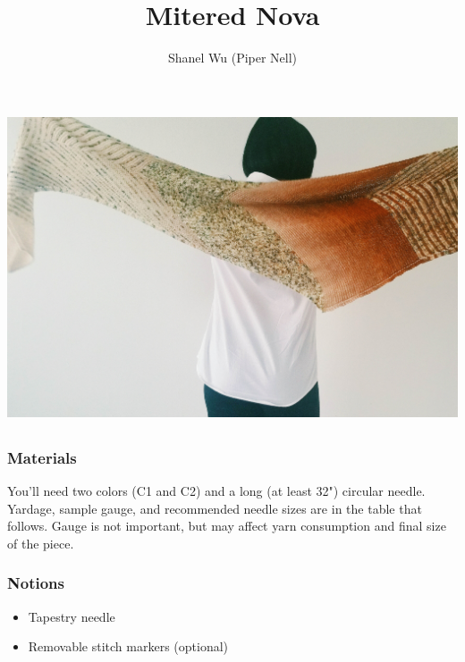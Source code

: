 \documentclass[12pt]{article}
\title{Mitered Nova}
\author{Shanel Wu (Piper Nell)}
\begin{document}
\begin{titlingpage}

\begin{center}\includegraphics[width = 6.5in]{FW-spread-small} \end{center}

\begin{multicols}{2}

\section*{\thetitle}
\vspace{-1em}
\subsubsection*{\theauthor}
\subsubsection*{Materials}

You'll need two colors (C1 and C2) and a long (at least 32") circular needle. \\ Yardage, sample gauge, and recommended needle sizes are in the table that follows. Gauge is not important, but may affect yarn consumption and final size of the piece.

\vfill
\columnbreak
\subsubsection*{Notions}
\begin{itemize}
\item Tapestry needle \vspace{-1em}
\item Removable stitch markers (optional)
\end{itemize}


\end{multicols}
\end{titlingpage}
\end{document}
